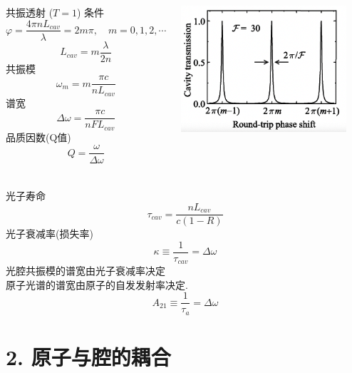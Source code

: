   \begin{frame} 
  \frametitle{}
  \begin{columns}[T,onlytextwidth]
       共振透射 ($T=1$) 条件
       \[ \varphi =\frac{4\pi n L_{cav}}{\lambda} = 2 m \pi, \quad m=0, 1, 2, \cdots  \]
       \[L_{cav} = m \frac{\lambda}{2n}\]
       共振模
       \[ \omega_m = m \frac{\pi c }{n L_{cav}}\]
       谱宽
       \[ \Delta \omega = \frac{\pi c }{n F L_{cav}}\]
       品质因数(Q值)
       \[ Q= \frac{\omega}{\Delta \omega }\]
       \begin{center}
            \includegraphics[width=0.9\textwidth]{figs/2022-05-23-00-15-53.png}
       \end{center}
    \end{columns}
  \end{frame}

  \begin{frame} 
  \frametitle{}
    光子寿命
    \[ \tau_{cav} = \frac{n L_{cav}}{c(1-R)}\]
    光子衰减率(损失率)
  \[ \boxed{\kappa \equiv  \frac{1}{\tau_{cav}} = \Delta \omega } \]
       光腔共振模的谱宽由光子衰减率决定 \\ {\vspace*{1.3em}}
       原子光谱的谱宽由原子的自发发射率决定.
       \[ \boxed{A_{21} \equiv  \frac{1}{\tau_{a}} = \Delta \omega } \]
  \end{frame}

  \section{2. 原子与腔的耦合}


